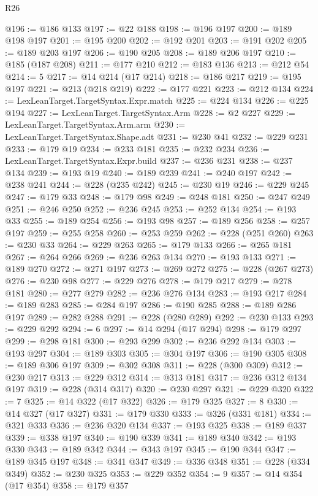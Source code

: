 \begin{lexlean}{R26}
\begin{coremodule}
@196 := @186 @133
@197 := @22 @188
@198 := @196 @197
@200 := @189 @198 @197
@201 := @195 @200
@202 := @192 @201
@203 := @191 @202
@205 := @189 @203 @197
@206 := @190 @205
@208 := @189 @206 @197
@210 := @185 (@187 @208)
@211 := @177 @210
@212 := @183 @136
@213 := @212 @54
@214 := 5
@217 := @14 @214 (@17 @214)
@218 := @186 @217
@219 := @195 @197
@221 := @213 (@218 @219)
@222 := @177 @221
@223 := @212 @134
@224 := LexLeanTarget.TargetSyntax.Expr.match
@225 := @224 @134
@226 := @225 @194
@227 := LexLeanTarget.TargetSyntax.Arm
@228 := @2 @227
@229 := LexLeanTarget.TargetSyntax.Arm.arm
@230 := LexLeanTarget.TargetSyntax.Shape.adt
@231 := @230 @41
@232 := @229 @231
@233 := @179 @19
@234 := @233 @181
@235 := @232 @234
@236 := LexLeanTarget.TargetSyntax.Expr.build
@237 := @236 @231
@238 := @237 @134
@239 := @193 @19
@240 := @189 @239
@241 := @240 @197
@242 := @238 @241
@244 := @228 (@235 @242)
@245 := @230 @19
@246 := @229 @245
@247 := @179 @33
@248 := @179 @98
@249 := @248 @181
@250 := @247 @249
@251 := @246 @250
@252 := @236 @245
@253 := @252 @134
@254 := @193 @33
@255 := @189 @254
@256 := @193 @98
@257 := @189 @256
@258 := @257 @197
@259 := @255 @258
@260 := @253 @259
@262 := @228 (@251 @260)
@263 := @230 @33
@264 := @229 @263
@265 := @179 @133
@266 := @265 @181
@267 := @264 @266
@269 := @236 @263 @134
@270 := @193 @133
@271 := @189 @270
@272 := @271 @197
@273 := @269 @272
@275 := @228 (@267 @273)
@276 := @230 @98
@277 := @229 @276
@278 := @179 @217
@279 := @278 @181
@280 := @277 @279
@282 := @236 @276 @134
@283 := @193 @217
@284 := @189 @283
@285 := @284 @197
@286 := @190 @285
@288 := @189 @286 @197
@289 := @282 @288
@291 := @228 (@280 @289)
@292 := @230 @133
@293 := @229 @292
@294 := 6
@297 := @14 @294 (@17 @294)
@298 := @179 @297
@299 := @298 @181
@300 := @293 @299
@302 := @236 @292 @134
@303 := @193 @297
@304 := @189 @303
@305 := @304 @197
@306 := @190 @305
@308 := @189 @306 @197
@309 := @302 @308
@311 := @228 (@300 @309)
@312 := @230 @217
@313 := @229 @312
@314 := @313 @181
@317 := @236 @312 @134 @197
@319 := @228 (@314 @317)
@320 := @230 @297
@321 := @229 @320
@322 := 7
@325 := @14 @322 (@17 @322)
@326 := @179 @325
@327 := 8
@330 := @14 @327 (@17 @327)
@331 := @179 @330
@333 := @326 (@331 @181)
@334 := @321 @333
@336 := @236 @320 @134
@337 := @193 @325
@338 := @189 @337
@339 := @338 @197
@340 := @190 @339
@341 := @189 @340
@342 := @193 @330
@343 := @189 @342
@344 := @343 @197
@345 := @190 @344
@347 := @189 @345 @197
@348 := @341 @347
@349 := @336 @348
@351 := @228 (@334 @349)
@352 := @230 @325
@353 := @229 @352
@354 := 9
@357 := @14 @354 (@17 @354)
@358 := @179 @357

\end{coremodule}
\end{lexlean}

